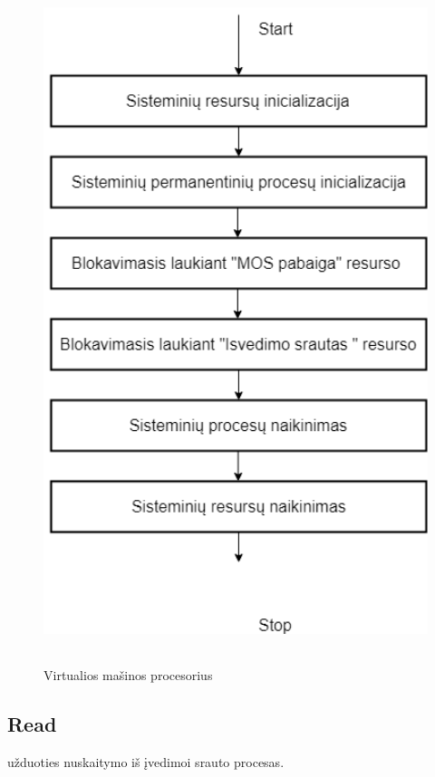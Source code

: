 \documentclass[oneside]{VUMIFPSkursinis}
\begin{document}
\begin{figure}[H]
		\centering	
	\includegraphics[width=18cm,height=20cm,keepaspectratio]{StartStop.png}
	\caption{Virtualios mašinos procesorius}
	\label{fig:Virtualios mašinos procesorius}
\end{figure}

\subsection{Read} užduoties nuskaitymo iš įvedimoi srauto procesas.
\end{document}
